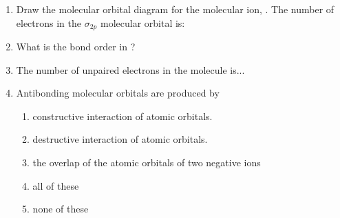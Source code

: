 \documentclass[main.tex]{subfiles}
\begin{document}
\begin{fullwidth}
\begin{multicols}{2}
\begin{enumerate}[resume]
\item Draw the molecular orbital diagram for the molecular ion, . The number of electrons in the $\sigma_{2p}$ molecular orbital is:
\begin{enumerate}[label=(\alph*)]\vspace{-0.5cm}
\end{enumerate}\vspace{-0.5cm}
		
\item What is the bond order in ?
\begin{enumerate}[label=(\alph*)]\vspace{-0.5cm}
\end{enumerate}\vspace{-0.5cm}

		
\item The number of unpaired electrons in the  molecule is...
\begin{enumerate}[label=(\alph*)]\vspace{-0.5cm}
\end{enumerate}\vspace{-0.5cm}

		
\item Antibonding molecular orbitals are produced by
\begin{enumerate}[label=(\alph*)] 

\item  constructive interaction of atomic orbitals.
\item  destructive interaction of atomic orbitals.
\item  the overlap of the atomic orbitals of two negative ions
\item  all of these
\item  none of these
 \end{enumerate} 


\end{enumerate}
\end{multicols}
\end{fullwidth}
\end{document}
